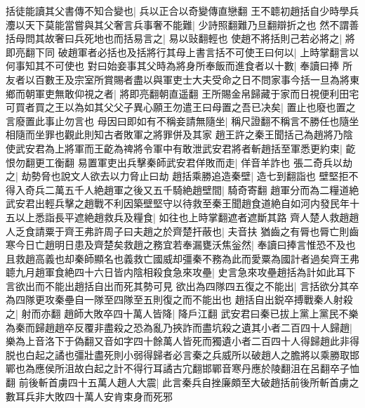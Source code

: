 括徒能讀其父書傳不知合變也|{
	兵以正合以奇變傳直戀翻}
王不聼初趙括自少時學兵灋以天下莫能當嘗與其父奢言兵事奢不能難|{
	少詩照翻難乃旦翻辯折之也}
然不謂善括母問其故奢曰兵死地也而括易言之|{
	易以䜴翻輕也}
使趙不將括則己若必將之|{
	將即亮翻下同}
破趙軍者必括也及括將行其母上書言括不可使王曰何以|{
	上時掌翻言以何事知其不可使也}
對曰始妾事其父時為將身所奉飯而進食者以十數|{
	奉讀曰捧}
所友者以百數王及宗室所賞賜者盡以與軍吏士大夫受命之日不問家事今括一旦為將東鄉而朝軍吏無敢仰視之者|{
	將即亮翻朝直遥翻}
王所賜金帛歸藏于家而日視便利田宅可買者買之王以為如其父父子異心願王勿遣王曰母置之吾已决矣|{
	置止也廢也置之言廢置此事止勿言也}
母因曰即如有不稱妾請無隨坐|{
	稱尺證翻不稱言不勝任也隨坐相隨而坐罪也觀此則知古者敗軍之將罪併及其家}
趙王許之秦王聞括己為趙將乃陰使武安君為上將軍而王齕為禆將令軍中有敢泄武安君將者斬趙括至軍悉更約束|{
	齕恨勿翻更工衡翻}
易置軍吏出兵擊秦師武安君佯敗而走|{
	佯音羊詐也}
張二奇兵以劫之|{
	劫勢脅也說文人欲去以力脅止曰劫}
趙括乘勝追造秦壁|{
	造七到翻詣也}
壁堅拒不得入奇兵二萬五千人絶趙軍之後又五千騎絶趙壁間|{
	騎奇寄翻}
趙軍分而為二糧道絶武安君出輕兵擊之趙戰不利因築壁堅守以待救至秦王聞趙食道絶自如河内發民年十五以上悉詣長平遮絶趙救兵及糧食|{
	如往也上時掌翻遮者遮斷其路}
齊人楚人救趙趙人乏食請粟于齊王弗許周子曰夫趙之於齊楚扞蔽也|{
	夫音扶}
猶齒之有脣也脣亡則齒寒今日亡趙明日患及齊楚矣救趙之務宜若奉漏甕沃焦釡然|{
	奉讀曰捧言惟恐不及也}
且救趙高義也却秦師顯名也義救亡國威却彊秦不務為此而愛粟為國計者過矣齊王弗聼九月趙軍食絶四十六日皆内陰相殺食急來攻壘|{
	史言急來攻壘趙括為計如此耳下言欲出而不能出趙括自出而死其勢可見}
欲出為四隊四五復之不能出|{
	言括欲分其卒為四隊更攻秦壘自一隊至四隊至五則復之而不能出也}
趙括自出鋭卒搏戰秦人射殺之|{
	射而亦翻}
趙師大敗卒四十萬人皆降|{
	降戶江翻}
武安君曰秦已拔上黨上黨民不樂為秦而歸趙趙卒反覆非盡殺之恐為亂乃挾詐而盡坑殺之遺其小者二百四十人歸趙|{
	樂為上音洛下于偽翻又音如字四十餘萬人皆死而獨遺小者二百四十人得歸趙此非得脱也白起之譎也彊壯盡死則小弱得歸者必言秦之兵威所以破趙人之膽將以乘勝取邯鄲也為應侯所沮故白起之計不得行耳譎古宂翻邯鄲音寒丹應於陵翻沮在呂翻卒子恤翻}
前後斬首虜四十五萬人趙人大震|{
	此言秦兵自挫廉頗至大破趙括前後所斬首虜之數耳兵非大敗四十萬人安肯束身而死邪}


